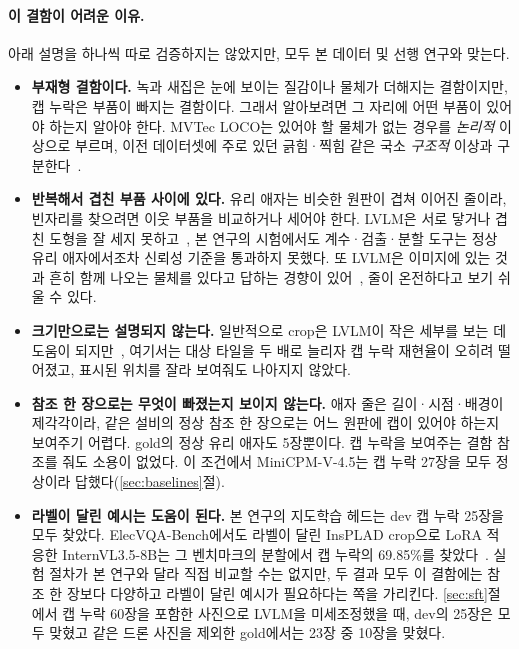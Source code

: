 \documentclass[11pt]{article}
\begin{document}
\paragraph{이 결함이 어려운 이유.} 아래 설명을 하나씩 따로 검증하지는 않았지만, 모두 본 데이터 및 선행 연구와 맞는다.
\begin{itemize}
  \item \textbf{부재형 결함이다.} 녹과 새집은 눈에 보이는 질감이나 물체가 더해지는 결함이지만, 캡 누락은 부품이 빠지는 결함이다. 그래서 알아보려면 그 자리에 어떤 부품이 있어야 하는지 알아야 한다. MVTec LOCO는 있어야 할 물체가 없는 경우를 \emph{논리적} 이상으로 부르며, 이전 데이터셋에 주로 있던 긁힘·찍힘 같은 국소 \emph{구조적} 이상과 구분한다~\cite{bergmann2022loco}.
  \item \textbf{반복해서 겹친 부품 사이에 있다.} 유리 애자는 비슷한 원판이 겹쳐 이어진 줄이라, 빈자리를 찾으려면 이웃 부품을 비교하거나 세어야 한다. LVLM은 서로 닿거나 겹친 도형을 잘 세지 못하고~\cite{rahmanzadehgervi2024blind}, 본 연구의 시험에서도 계수·검출·분할 도구는 정상 유리 애자에서조차 신뢰성 기준을 통과하지 못했다. 또 LVLM은 이미지에 있는 것과 흔히 함께 나오는 물체를 있다고 답하는 경향이 있어~\cite{li2023pope}, 줄이 온전하다고 보기 쉬울 수 있다.
  \item \textbf{크기만으로는 설명되지 않는다.} 일반적으로 crop은 LVLM이 작은 세부를 보는 데 도움이 되지만~\cite{zhang2025mllmsknow}, 여기서는 대상 타일을 두 배로 늘리자 캡 누락 재현율이 오히려 떨어졌고, 표시된 위치를 잘라 보여줘도 나아지지 않았다.
  \item \textbf{참조 한 장으로는 무엇이 빠졌는지 보이지 않는다.} 애자 줄은 길이·시점·배경이 제각각이라, 같은 설비의 정상 참조 한 장으로는 어느 원판에 캡이 있어야 하는지 보여주기 어렵다. gold의 정상 유리 애자도 5장뿐이다. 캡 누락을 보여주는 결함 참조를 줘도 소용이 없었다. 이 조건에서 MiniCPM-V-4.5는 캡 누락 27장을 모두 정상이라 답했다(\ref{sec:baselines}절).
  \item \textbf{라벨이 달린 예시는 도움이 된다.} 본 연구의 지도학습 헤드는 dev 캡 누락 25장을 모두 찾았다. ElecVQA-Bench에서도 라벨이 달린 InsPLAD crop으로 LoRA 적응한 InternVL3.5-8B는 그 벤치마크의 분할에서 캡 누락의 69.85\%를 찾았다~\cite{zhang2026elecvqa}. 실험 절차가 본 연구와 달라 직접 비교할 수는 없지만, 두 결과 모두 이 결함에는 참조 한 장보다 다양하고 라벨이 달린 예시가 필요하다는 쪽을 가리킨다. \ref{sec:sft}절에서 캡 누락 60장을 포함한 사진으로 LVLM을 미세조정했을 때, dev의 25장은 모두 맞혔고 같은 드론 사진을 제외한 gold에서는 23장 중 10장을 맞혔다.
\end{itemize}
\end{document}
